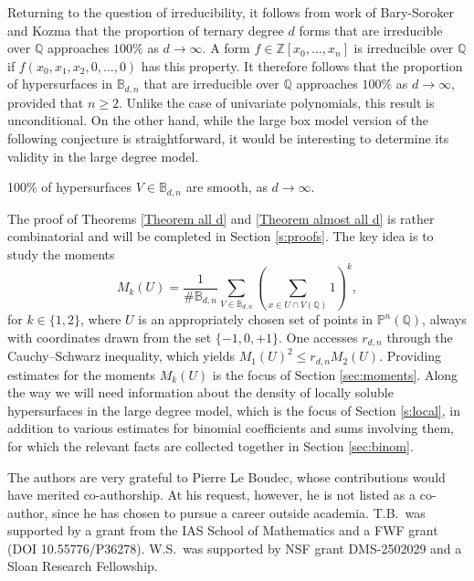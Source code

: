 \documentclass[11pt, reqno]{amsart}
\numberwithin{equation}{section}
\renewcommand{\leq}{\leqslant}
\renewcommand{\geq}{\geqslant}
\begin{document}
Returning to the question of irreducibility, it follows 
from 
work of Bary-Soroker and Kozma \cite{bary} that 
the proportion of 
ternary degree $d$ forms 
that are irreducible over $\mathbb{Q}$
approaches  $100\%$ as $d\to \infty$. 
A form $f\in \mathbb{Z}[x_0,\dots,x_n]$ is irreducible over $\mathbb{Q}$ if 
$f(x_0,x_1,x_2,0,\dots,0)$ has this property. 
It therefore  follows that 
the proportion of 
hypersurfaces in  $\mathbb{B}_{d,n}$ that are irreducible over $\mathbb{Q}$
approaches  $100\%$ as $d\to \infty$, 
provided that $n\geq 2$. 
Unlike the case of univariate polynomials, this result is  unconditional. 
On the other hand, while the large box model version of the following conjecture is straightforward, 
it would be interesting to determine its validity in the large degree model.

\begin{con}
100\% of hypersurfaces $V\in \mathbb{B}_{d,n}$ are smooth, as $d\to \infty$.
\end{con}
 

The proof of Theorems \ref{Theorem all d} and 
\ref{Theorem almost all d} is rather combinatorial and will be completed in Section \ref{s:proofs}.
The key idea is
to study the moments 
$$
M_k(U) = \frac1{\# \mathbb{B}_{d,n}} \sum_{V \in \mathbb{B}_{d,n}} \left( \sum_{x \in U\cap V(\mathbb{Q})} 1 \right)^k,
$$
for $k\in \{1,2\}$, where $U$ is an appropriately chosen set of points in $\mathbb{P}^{n}(\mathbb{Q})$, always with coordinates drawn from the set $\{-1,0,+1\}$. One accesses $r_{d,n}$ through the Cauchy--Schwarz inequality, which yields
$M_1(U)^2\leq r_{d,n} M_2(U)$.  Providing estimates for the moments $M_k(U)$ is  the focus of Section \ref{sec:moments}.
Along the way we will need information about the density of locally soluble hypersurfaces in the large degree model, which is the focus of Section \ref{s:local}, in addition to  various estimates for binomial coefficients and sums involving them, for which the relevant facts are collected together in Section \ref{sec:binom}.



\begin{ack}
The authors are very grateful to Pierre Le Boudec, whose contributions would have merited co-authorship. At his request, however, he is not listed as a co-author, since he has chosen to pursue a career outside academia.
T.B.\ was
supported by  a grant from the IAS School of Mathematics and a FWF grant (DOI 10.55776/P36278).
W.S.\ was supported by  NSF grant DMS-2502029 and a Sloan Research Fellowship.

\end{ack}
\end{document}
